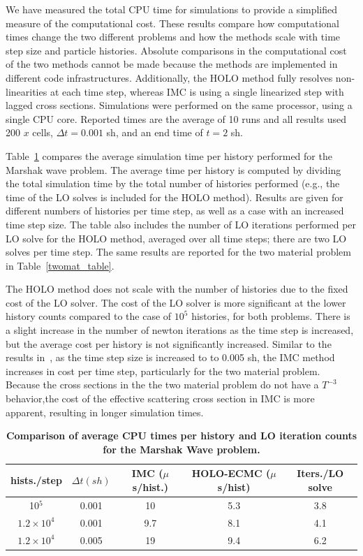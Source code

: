 \documentclass[12pt]{article}
\begin{document}
\begin{center}
We have measured the total CPU time for simulations to provide a simplified measure of the
computational cost.  These results compare how computational times change the two
different problems and how the methods scale with time step size and particle histories.  Absolute comparisons in the computational cost of the two
methods cannot be made because the methods are implemented
in different code infrastructures. Additionally, the HOLO method fully resolves
non-linearities at each time step, whereas IMC is using a single linearized step with
lagged cross sections. Simulations were performed on the same processor, using a single CPU
core.  Reported times are the average of 10 runs and all results used 200 $x$ cells,
$\Delta t = 0.001$ sh, and an end time of $t=2$ sh.

Table~\ref{marshak_table} compares the average
simulation time per history performed for the Marshak wave problem.  The average time per history is computed by dividing the total simulation time by
the total number of histories performed (e.g., the time of the LO solves is included for
the HOLO method).  Results are given for different numbers of histories per time step, as
well as a case with an increased time step size.  The table also includes the number of LO
iterations performed per LO solve for the HOLO method, averaged over all time steps;
there are two LO solves per time step.  The same results are reported for the two
material problem in Table~\ref{twomat_table}.

The HOLO method does not scale with the number of
histories due to the fixed cost of the LO solver.  The cost of the LO solver is more
significant at the lower history counts compared to the case of $10^5$
histories, for both problems. 
There is a slight increase in the number of
newton iterations as the time step is increased, but the average cost per history is
not significantly increased.   Similar to the results
in~\cite{park}, as the time step size is increased to to 0.005 sh, the IMC method
increases in cost per time step, particularly for the two material problem. Because
the cross sections in the the two material problem do not have a $T^{-3}$
behavior,the cost of the effective scattering cross section in IMC is more apparent,
resulting in longer simulation times. 
\begin{table}[H]
\centering
\caption{\label{marshak_table} \textbf{Comparison of average CPU times per history
    and LO iteration counts for the Marshak Wave problem. }}
\vspace{-0.1in}
	\begin{tabular}{|cc|c|cc|}\hline
hists./step & $\Delta t (sh)$ & IMC ($\mu$s/hist.) & HOLO-ECMC ($\mu$s/hist) & Iters./LO solve \\ \hline
10$^5$                    &   0.001	& 10  &  5.3   & 3.8               \\
$1.2\times10^4 $          &   0.001	& 9.7 &	 8.1   & 4.1               \\
$1.2\times10^4$           &   0.005	& 19  &  9.4   & 6.2                \\ \hline
\end{tabular}
\end{table}


\end{center}
\end{document}
